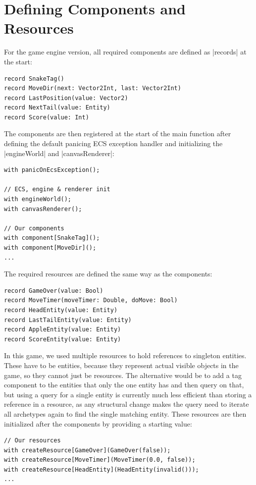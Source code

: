 \section{Defining Components and Resources}

For the game engine version, all required components are defined as |records| at the start:

\begin{lstlisting}
record SnakeTag()
record MoveDir(next: Vector2Int, last: Vector2Int)
record LastPosition(value: Vector2)
record NextTail(value: Entity)
record Score(value: Int)
\end{lstlisting}

The components are then registered at the start of the main function after defining the default panicing ECS exception handler and initializing the |engineWorld| and |canvasRenderer|:

\begin{lstlisting}
with panicOnEcsException();

// ECS, engine & renderer init
with engineWorld();
with canvasRenderer();

// Our components
with component[SnakeTag]();
with component[MoveDir]();
...
\end{lstlisting}

The required resources are defined the same way as the components:

\begin{lstlisting}
record GameOver(value: Bool)
record MoveTimer(moveTimer: Double, doMove: Bool)
record HeadEntity(value: Entity)
record LastTailEntity(value: Entity)
record AppleEntity(value: Entity)
record ScoreEntity(value: Entity)
\end{lstlisting}

In this game, we used multiple resources to hold references to singleton entities. These have to be entities, because they represent actual visible objects in the game, so they cannot just be resources. The alternative would be to add a tag component to the entities that only the one entity has and then query on that, but using a query for a single entity is currently much less efficient than storing a reference in a resource, as any structural change makes the query need to iterate all archetypes again to find the single matching entity. These resources are then initialized after the components by providing a starting value:

\begin{lstlisting}
// Our resources
with createResource[GameOver](GameOver(false));
with createResource[MoveTimer](MoveTimer(0.0, false));
with createResource[HeadEntity](HeadEntity(invalid()));
...
\end{lstlisting}

